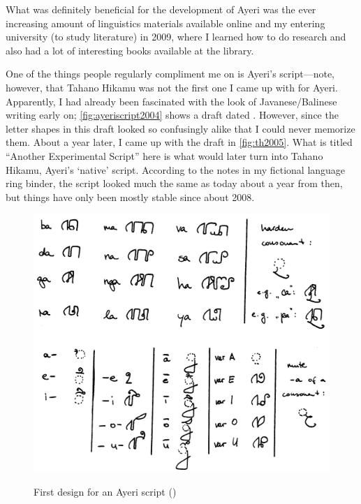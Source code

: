 What was definitely beneficial for the development of Ayeri was the ever 
increasing amount of linguistics materials available online and my entering 
university (to study literature) in 2009, where I learned how to do research 
and also had a lot of interesting books available at the library.

One of the things people regularly compliment me on is Ayeri's script---note, 
however, that Tahano Hikamu was not the first one I came up with for Ayeri. 
Apparently, I had already been fascinated with the look of Javanese/Balinese 
writing early on; \autoref{fig:ayeriscript2004} shows a draft dated 
. However, since the letter shapes in this draft looked so 
confusingly alike that I could never memorize them. About a year later, I came 
up with the draft in \autoref{fig:th2005}. What is titled ``Another 
Experimental Script'' here is what would later turn into Tahano Hikamu, Ayeri's 
`native' script. According to the notes in my fictional language ring binder, 
the script looked much the same as today about a year from then, but things 
have only been mostly stable since about 2008.

\begin{figure}[tph]
	\centering
	\caption[First design for an Ayeri script]{First design for an Ayeri script ()}
	\includegraphics[width=\textwidth, keepaspectratio]{images/ayeriscript2004-300dpi-bw.png}
	\label{fig:ayeriscript2004}
\end{figure}


